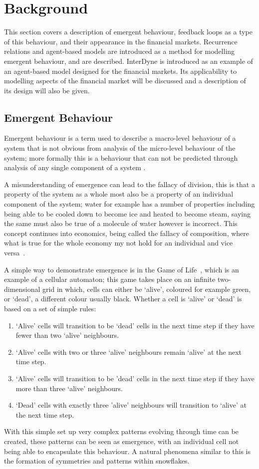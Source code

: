 \documentclass{article}
\begin{document}
\newpage
\section{Background}
This section covers a description of emergent behaviour, feedback loops as a type of this behaviour, and their appearance in the financial markets. Recurrence relations and agent-based models are introduced as a method for modelling emergent behaviour, and are described. InterDyne is introduced as an example of an agent-based model designed for the financial markets. Its applicability to modelling aspects of the financial market will be discussed and a description of its design will also be given.   

\subsection{Emergent Behaviour}
Emergent behaviour is a term used to describe a macro-level behaviour of a system that is not obvious from analysis of the micro-level behaviour of the system; more formally this is a behaviour that can not be predicted through analysis of any single component of a system \cite{EB_systemofsystemsGLangford}.

A misunderstanding of emergence can lead to the fallacy of division, this is that a property of the system as a whole most also be a property of an individual component of the system; water for example has a number of properties including being able to be cooled down to become ice and heated to become steam, saying the same must also be true of a molecule of water however is incorrect. This concept continues into economics, being called the fallacy of composition, where what is true for the whole economy my not hold for an individual and vice versa~\cite{fallacyofcompostionBook}.
       
A simple way to demonstrate emergence is in the Game of Life~\cite{gameoflifepage}, which is an example of a cellular automaton; this game takes place on an infinite two-dimensional grid in which, cells can either be `alive', coloured for example green, or `dead', a different colour usually black. Whether a cell is `alive' or `dead' is based on a set of simple rules:   
\begin{enumerate}
  \item `Alive' cells will transition to be `dead' cells in the next time step if they have fewer than two `alive' neighbours.
  \item `Alive' cells with two or three `alive' neighbours remain `alive' at the next time step.
  \item `Alive' cells will transition to be 'dead' cells in the next time step if they have more than three `alive' neighbours.
  \item `Dead' cells with exactly three 'alive' neighbours will transition to `alive' at the next time step.
\end{enumerate}
With this simple set up very complex patterns evolving through time can be created, these patterns can be seen as emergence, with an individual cell not being able to encapsulate this behaviour. A natural phenomena similar to this is the formation of symmetries and patterns within snowflakes.
\end{document}
